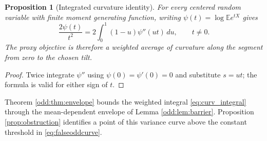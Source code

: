 \documentclass[11pt,a4paper]{article}
\newtheorem{proposition}[theorem]{Proposition}
\newcommand{\E}{\mathbb E}\newcommand{\R}{\mathbb R}\newcommand{\N}{\mathbb N}\newcommand{\one}{\mathbf1}
\begin{document}
\begin{proposition}[Integrated curvature identity]\label{prop:integral}
For every centered random variable with finite moment generating function, writing $\psi(t)=\log\E e^{tX}$ gives
\begin{equation}\label{eq:curv_integral}
 \frac{2\psi(t)}{t^2}=2\int_0^1(1-u)\psi''(ut)\,du,
 \qquad t\ne0.
\end{equation}
The proxy objective is therefore a weighted average of curvature along the segment from zero to the chosen tilt.
\end{proposition}
\begin{proof}
Twice integrate $\psi''$ using $\psi(0)=\psi'(0)=0$ and substitute $s=ut$; the formula is valid for either sign of $t$.
\end{proof}

Theorem \ref{odd:thm:envelope} bounds the weighted integral \eqref{eq:curv_integral} through the mean-dependent envelope of Lemma \ref{odd:lem:barrier}. Proposition \ref{prop:obstruction} identifies a point of this variance curve above the constant threshold in \eqref{eq:falseoddcurve}.

\end{document}
